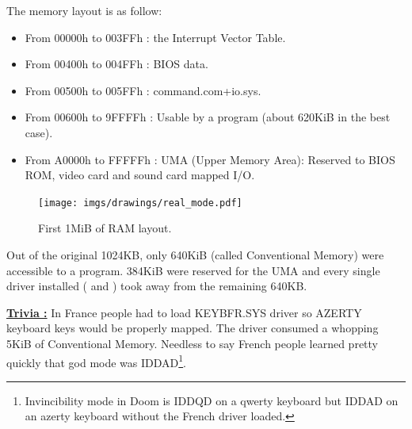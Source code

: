 \documentclass[book.tex]{subfiles}
\begin{document}
  \bigskip
The memory layout is as follow:\\
\begin{itemize}
\item From 00000h to 003FFh : the Interrupt Vector Table.
\item From 00400h to 004FFh : BIOS data.
\item From 00500h to 005FFh : command.com+io.sys.
\item From 00600h to 9FFFFh : Usable by a program (about 620KiB in the best case). 
\item From A0000h to FFFFFh : UMA (Upper Memory Area): Reserved to BIOS ROM, video card and sound card mapped I/O.
\end{itemize}

\begin{figure}[H]
\centering
\texttt{[image: imgs/drawings/real\_mode.pdf]}

\caption{First 1MiB of RAM layout.}
\label{fig:fp_internals}
\end{figure}


Out of the original 1024KB, only 640KiB (called Conventional Memory) were accessible to a program. 384KiB were reserved for the UMA and every single driver installed ( and )  took away from the remaining 640KB.

\bigskip

\textbf{\underline{Trivia :}}  In France people had to load KEYBFR.SYS driver so AZERTY keyboard keys would be properly mapped. The driver consumed a whopping 5KiB of Conventional Memory. Needless to say French people learned pretty quickly that god mode was IDDAD\footnote{Invincibility mode in Doom is IDDQD on a qwerty keyboard but IDDAD on an azerty keyboard without the French driver loaded.}.\\
\par
\end{document}
